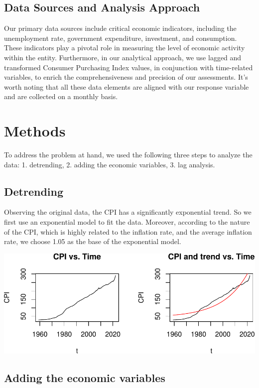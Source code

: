 \documentclass[
  man,floatsintext,
  man]{apa6}
\begin{document}
\subsection{Data Sources and Analysis Approach}\label{data-sources-and-analysis-approach}

Our primary data sources include critical economic indicators, including the unemployment rate, government expenditure, investment, and consumption. These indicators play a pivotal role in measuring the level of economic activity within the entity. Furthermore, in our analytical approach, we use lagged and transformed Consumer Purchasing Index values, in conjunction with time-related variables, to enrich the comprehensiveness and precision of our assessments. It's worth noting that all these data elements are aligned with our response variable and are collected on a monthly basis.

\section{Methods}\label{methods}

To address the problem at hand, we used the following three steps to analyze the data: 1. detrending, 2. adding the economic variables, 3. lag analysis.

\subsection{Detrending}\label{detrending}

Observing the original data, the CPI has a significantly exponential trend. So we first use an exponential model to fit the data.
Moreover, according to the nature of the CPI, which is highly related to the inflation rate, and the average inflation rate, we choose 1.05 as the base of the exponential model.

\includegraphics{stat429_group2_final_proj_files/figure-latex/unnamed-chunk-1-1.pdf}

\subsection{Adding the economic variables}\label{adding-the-economic-variables}
\end{document}
